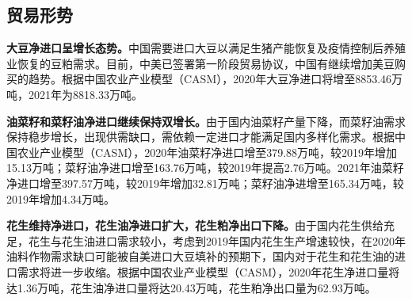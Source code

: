 \documentclass{progbookcn}
\begin{document}
\subsection{贸易形势}

\textbf{大豆净进口呈增长态势。}中国需要进口大豆以满足生猪产能恢复及疫情控制后养殖业恢复的豆粕需求。目前，中美已签署第一阶段贸易协议，中国有继续增加美豆购买的趋势。根据中国农业产业模型（CASM），2020年大豆净进口将增至8853.46万吨，2021年为8818.33万吨。

\textbf{油菜籽和菜籽油净进口继续保持双增长。}由于国内油菜籽产量下降，而菜籽油需求保持稳步增长，出现供需缺口，需依赖一定进口才能满足国内多样化需求。根据中国农业产业模型（CASM），2020年油菜籽净进口增至379.88万吨，较2019年增加15.13万吨；菜籽油净进口增至163.76万吨，较2019年提高2.76万吨。2021年油菜籽净进口增至397.57万吨，较2019年增加32.81万吨；菜籽油净进增至165.34万吨，较2019年增加4.34万吨。

\textbf{花生维持净进口，花生油净进口扩大，花生粕净出口下降。}由于国内花生供给充足，花生与花生油进口需求较小，考虑到2019年国内花生生产增速较快，在2020年油料作物需求缺口可能被自美进口大豆填补的预期下，国内对于花生和花生油的进口需求将进一步收缩。根据中国农业产业模型（CASM），2020年花生净进口量将达1.36万吨，花生油净进口量将达20.43万吨，花生粕净出口量为62.93万吨。

\begin{table}[]
\centering
{}
\end{table}
\end{document}
